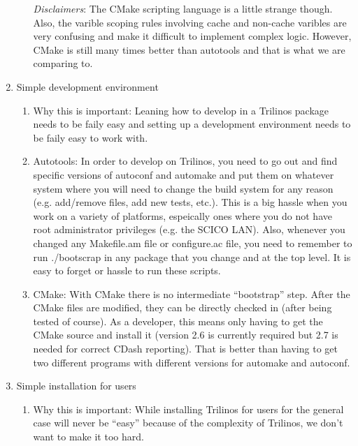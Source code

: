 \documentclass[pdf,ps2pdf,11pt]{SANDreport}
\begin{document}
\begin{enumerate}
\begin{enumerate}
  {}\textit{Disclaimers}: The CMake scripting language is a little
  strange though.  Also, the varible scoping rules involving cache and
  non-cache varibles are very confusing and make it difficult to
  implement complex logic.  However, CMake is still many times better
  than autotools and that is what we are comparing to.

  \end{enumerate}

{}\item Simple development environment

  \begin{enumerate}

  {}\item Why this is important: Leaning how to develop in a Trilinos
  package needs to be faily easy and setting up a development
  environment needs to be faily easy to work with.

  {}\item Autotools: In order to develop on Trilinos, you need to go
  out and find specific versions of autoconf and automake and put them
  on whatever system where you will need to change the build system
  for any reason (e.g. add/remove files, add new tests, etc.).  This
  is a big hassle when you work on a variety of platforms, espeically
  ones where you do not have root administrator privileges (e.g. the
  SCICO LAN).  Also, whenever you changed any Makefile.am file or
  configure.ac file, you need to remember to run ./bootscrap in any
  package that you change and at the top level.  It is easy to forget
  or hassle to run these scripts.

  {}\item CMake: With CMake there is no intermediate ``bootstrap''
  step.  After the CMake files are modified, they can be directly
  checked in (after being tested of course).  As a developer, this
  means only having to get the CMake source and install it (version
  2.6 is currently required but 2.7 is needed for correct CDash
  reporting).  That is better than having to get two different
  programs with different versions for automake and autoconf.

  \end{enumerate}

{}\item Simple installation for users

  \begin{enumerate}

  {}\item Why this is important: While installing Trilinos for users
  for the general case will never be ``easy'' because of the
  complexity of Trilinos, we don't want to make it too hard.


\end{enumerate}
\end{enumerate}
\end{document}
